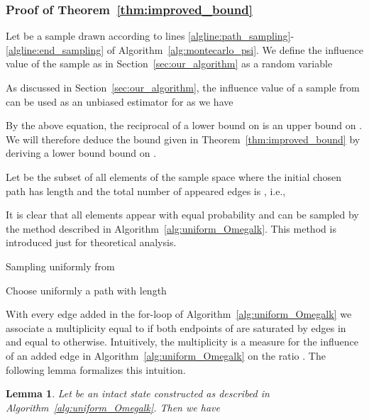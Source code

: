 \documentclass{article}
\newtheorem{lemma}{Lemma}
\begin{document}
\subsubsection*{Proof of Theorem~\ref{thm:improved_bound}}

Let  be a
sample drawn
according to lines
\mbox{\ref{algline:path_sampling}-\ref{algline:end_sampling}}
of \mbox{Algorithm~\ref{alg:montecarlo_psi}}. We define the
influence value  of the sample as in
Section~\ref{sec:our_algorithm} as a random variable


As discussed in Section~\ref{sec:our_algorithm}, the influence
value of a sample from  can be used as an unbiased estimator for
 as we have


By the above equation, the reciprocal of a lower bound on 
is an upper bound on . We will therefore
deduce the bound given in Theorem~\ref{thm:improved_bound} by
deriving a lower bound bound on .

Let  be the subset of all elements of the sample
space  where the initial chosen path has length 
and the total number of appeared edges is , i.e.,



It is clear that all elements  appear with equal probability
and can be
sampled by the method described in Algorithm~\ref{alg:uniform_Omegalk}. This method is introduced just
for theoretical analysis.

\linesnumbered
\begin{algorithm}[H]
\SetLine
\caption{Sampling uniformly from \label{alg:uniform_Omegalk}}
Choose uniformly a path  with length \;
\;
\;
\Return{}
\end{algorithm}

With every edge  added in the \mbox{for-loop} of
Algorithm~\ref{alg:uniform_Omegalk} we associate a multiplicity
 equal to  if both endpoints of 
are saturated by edges in 
and equal to  otherwise. Intuitively, the multiplicity
is a measure for the influence of an added
edge in Algorithm~\ref{alg:uniform_Omegalk} on the ratio
. The following lemma formalizes this
intuition.

\begin{lemma}\label{lem:multiplicity}
Let  be an intact state constructed as described in
Algorithm~\ref{alg:uniform_Omegalk}. Then we have

\end{lemma}
\end{document}
